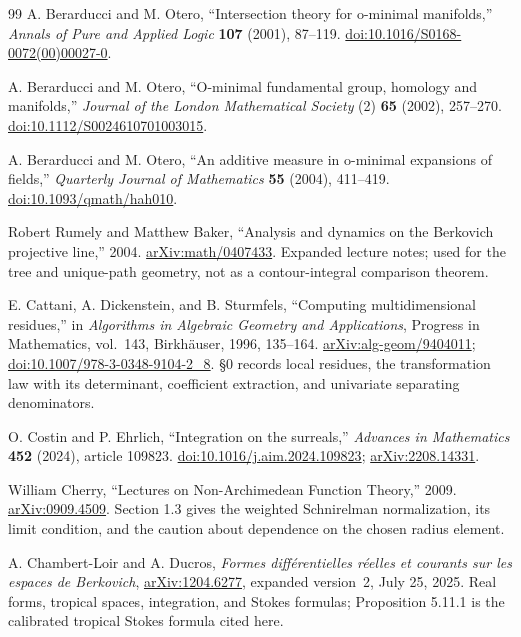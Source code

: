 \documentclass[11pt,letterpaper]{article}
\theoremstyle{definition}
\theoremstyle{remark}
\numberwithin{equation}{section}
\begin{document}
\begin{thebibliography}{99}
A. Berarducci and M. Otero, ``Intersection theory for o-minimal manifolds,''
\emph{Annals of Pure and Applied Logic} \textbf{107} (2001), 87--119.
\href{https://doi.org/10.1016/S0168-0072(00)00027-0}{doi:10.1016/S0168-0072(00)00027-0}.

A. Berarducci and M. Otero, ``O-minimal fundamental group, homology and manifolds,''
\emph{Journal of the London Mathematical Society} (2) \textbf{65} (2002), 257--270.
\href{https://doi.org/10.1112/S0024610701003015}{doi:10.1112/S0024610701003015}.

A. Berarducci and M. Otero, ``An additive measure in o-minimal expansions of fields,''
\emph{Quarterly Journal of Mathematics} \textbf{55} (2004), 411--419.
\href{https://doi.org/10.1093/qmath/hah010}{doi:10.1093/qmath/hah010}.

Robert Rumely and Matthew Baker,
``Analysis and dynamics on the Berkovich projective line,'' 2004.
\href{https://arxiv.org/abs/math/0407433}{arXiv:math/0407433}.
Expanded lecture notes; used for the tree and unique-path geometry, not as a
contour-integral comparison theorem.

E. Cattani, A. Dickenstein, and B. Sturmfels, ``Computing multidimensional residues,''
in \emph{Algorithms in Algebraic Geometry and Applications}, Progress in Mathematics,
vol.~143, Birkh\"auser, 1996, 135--164.
\href{https://arxiv.org/abs/alg-geom/9404011}{arXiv:alg-geom/9404011};
\href{https://doi.org/10.1007/978-3-0348-9104-2_8}{doi:10.1007/978-3-0348-9104-2\_8}.
\S0 records local residues, the transformation law with its determinant, coefficient
extraction, and univariate separating denominators.

O. Costin and P. Ehrlich, ``Integration on the surreals,'' \emph{Advances in
Mathematics} \textbf{452} (2024), article 109823.
\href{https://doi.org/10.1016/j.aim.2024.109823}{doi:10.1016/j.aim.2024.109823};
\href{https://arxiv.org/abs/2208.14331}{arXiv:2208.14331}.

William Cherry, ``Lectures on Non-Archimedean Function Theory,'' 2009.
\href{https://arxiv.org/abs/0909.4509}{arXiv:0909.4509}.
Section 1.3 gives the weighted Schnirelman normalization, its limit condition,
and the caution about dependence on the chosen radius element.

A. Chambert-Loir and A. Ducros, \emph{Formes diff\'erentielles r\'eelles et courants
sur les espaces de Berkovich},
\href{https://arxiv.org/abs/1204.6277}{arXiv:1204.6277}, expanded version~2, July 25,
2025. Real forms, tropical spaces, integration, and Stokes formulas; Proposition
5.11.1 is the calibrated tropical Stokes formula cited here.


\end{thebibliography}
\end{document}
